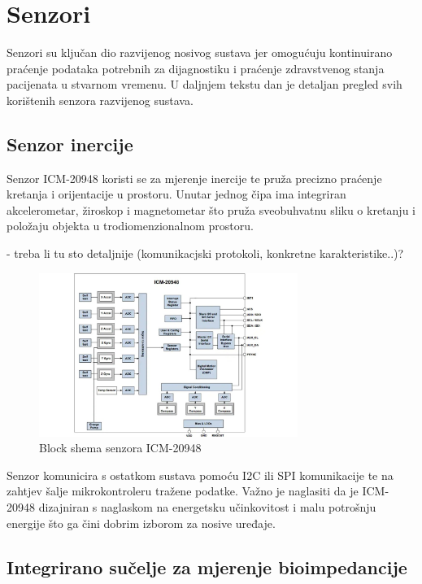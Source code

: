 \documentclass[../diplomski_rad.tex]{subfiles}
\begin{document}
\section{Senzori}

Senzori su ključan dio razvijenog nosivog sustava jer omogućuju kontinuirano praćenje podataka potrebnih 
za dijagnostiku i praćenje zdravstvenog stanja pacijenata u stvarnom vremenu.
U daljnjem tekstu dan je detaljan pregled svih korištenih senzora razvijenog sustava.

\subsection{Senzor inercije}

Senzor ICM-20948 koristi se za mjerenje inercije te pruža precizno praćenje kretanja i orijentacije u prostoru.
Unutar jednog čipa ima integriran akcelerometar, žiroskop i magnetometar što pruža sveobuhvatnu sliku o kretanju 
i položaju objekta u trodiomenzionalnom prostoru. 

- treba li tu sto detaljnije (komunikacjski protokoli, konkretne karakteristike..)?

\begin{figure}[htb]
    \centering
    \includegraphics[width=0.75\textwidth]{Figures/ICM-20948.jpg} 
    \caption{Block shema senzora ICM-20948 \cite{icm20948}}
    \label{slk:icm20948}
\end{figure}

Senzor komunicira s ostatkom sustava pomoću I2C ili SPI komunikacije te na zahtjev šalje mikrokontroleru tražene podatke.
Važno je naglasiti da je ICM-20948 dizajniran s naglaskom na energetsku učinkovitost i malu potrošnju energije 
što ga čini dobrim izborom za nosive uređaje.

\subsection{Integrirano sučelje za mjerenje bioimpedancije}
\end{document}
